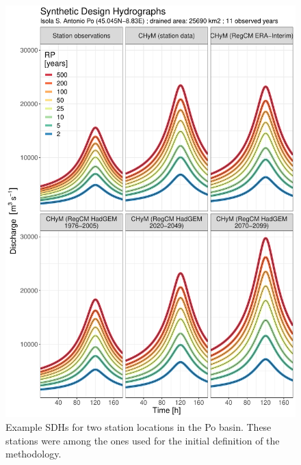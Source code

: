 \begin{figure}
        \includegraphics[width=0.45\textheight]{figures/valid_Q/SDH/id12_SDH_reg1_22}
    \decoRule
    \caption[Example SDHs (1)]{
        Example SDHs for two station locations in the Po basin. These stations were among the ones used for the initial definition of the methodology.
    }\label{fig:example_sdhs_1}
\end{figure}
